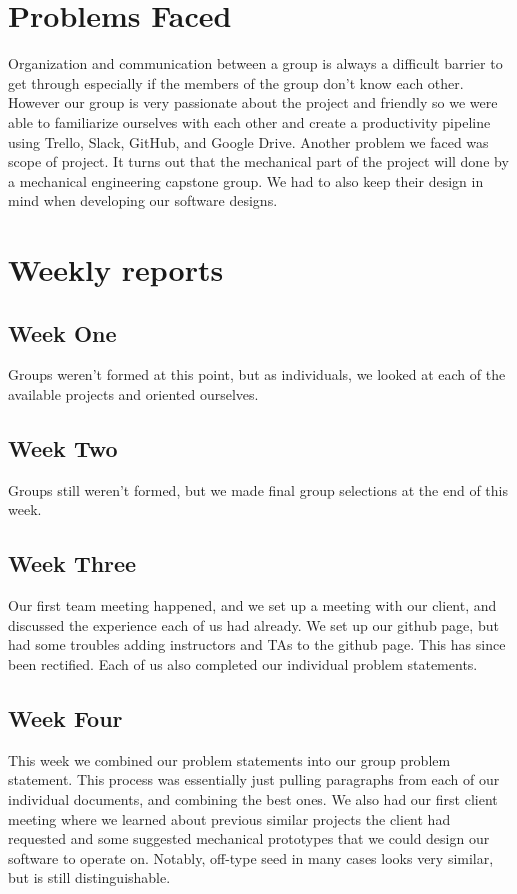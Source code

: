 \documentclass[onecolumn, draftclsnofoot,10pt, compsoc]{IEEEtran}
\begin{document}
\section{Problems Faced}
Organization and communication between a group is always a difficult barrier to get through especially if the members of the group don't know each other. However our group is very passionate about the project and friendly so we were able to familiarize ourselves with each other and create a productivity pipeline using Trello, Slack, GitHub, and Google Drive. Another problem we faced was scope of project. It turns out that the mechanical part of the project will done by a mechanical engineering capstone group. We had to also keep their design in mind when developing our software designs. 

\section{Weekly reports}

\subsection{Week One}
Groups weren't formed at this point, but as individuals, we looked at each of the available projects and oriented ourselves.
\subsection{Week Two}
Groups still weren't formed, but we made final group selections at the end of this week.
\subsection{Week Three}
Our first team meeting happened, and we set up a meeting with our client, and discussed the experience each of us had already. We set up our github page, but had some troubles adding instructors and TAs to the github page. This has since been rectified.
Each of us also completed our individual problem statements.
\subsection{Week Four}
This week we combined our problem statements into our group problem statement. This process was essentially just pulling paragraphs from each of our individual documents, and combining the best ones.
We also had our first client meeting where we learned about previous similar projects the client had requested and some suggested mechanical prototypes that we could design our software to operate on. Notably, off-type seed in many cases looks very similar, but is still distinguishable.
\end{document}
